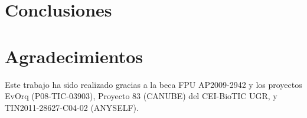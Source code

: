 \documentclass[runningheads]{llncs}
\begin{document}
\section{Conclusiones}
\label{sec:conclusions}

\section{Agradecimientos}
Este trabajo ha sido realizado gracias a la beca FPU AP2009-2942 y los proyectos EvOrq (P08-TIC-03903), Proyecto 83 (CANUBE) del CEI-BioTIC UGR, y TIN2011-28627-C04-02 (ANYSELF).



\end{document}
